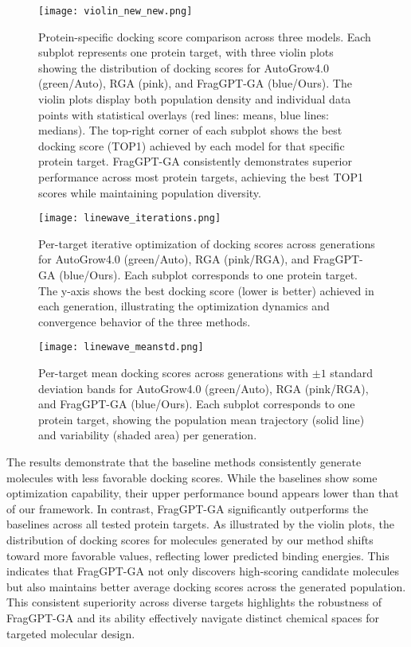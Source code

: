 \documentclass[lettersize,journal]{IEEEtran}
\begin{document}
\begin{figure*}[!t]
\centering
\texttt{[image: violin\_new\_new.png]}
\caption{Protein-specific docking score comparison across three models. Each subplot represents one protein target, with three violin plots showing the distribution of docking scores for AutoGrow4.0 (green/Auto), RGA (pink), and FragGPT-GA (blue/Ours). The violin plots display both population density and individual data points with statistical overlays (red lines: means, blue lines: medians). The top-right corner of each subplot shows the best docking score (TOP1) achieved by each model for that specific protein target. FragGPT-GA consistently demonstrates superior performance across most protein targets, achieving the best TOP1 scores while maintaining population diversity.}
\label{fig:violin_comparison}
\end{figure*}

\begin{figure*}[!t]
\centering
\texttt{[image: linewave\_iterations.png]}
\caption{Per-target iterative optimization of docking scores across generations for AutoGrow4.0 (green/Auto), RGA (pink/RGA), and FragGPT-GA (blue/Ours). Each subplot corresponds to one protein target. The y-axis shows the best docking score (lower is better) achieved in each generation, illustrating the optimization dynamics and convergence behavior of the three methods.}
\label{fig:linewave_iterations}
\end{figure*}

\begin{figure*}[!t]
\centering
\texttt{[image: linewave\_meanstd.png]}
\caption{Per-target mean docking scores across generations with $\pm 1$ standard deviation bands for AutoGrow4.0 (green/Auto), RGA (pink/RGA), and FragGPT-GA (blue/Ours). Each subplot corresponds to one protein target, showing the population mean trajectory (solid line) and variability (shaded area) per generation.}
\label{fig:linewave_meanstd}
\end{figure*}

The results demonstrate that the baseline methods consistently generate molecules with less favorable docking scores. While the baselines show some optimization capability, their upper performance bound appears lower than that of our framework. In contrast, FragGPT-GA significantly outperforms the baselines across all tested protein targets. As illustrated by the violin plots, the distribution of docking scores for molecules generated by our method shifts toward more favorable values, reflecting lower predicted binding energies. This indicates that FragGPT-GA not only discovers high-scoring candidate molecules but also maintains better average docking scores across the generated population. This consistent superiority across diverse targets highlights the robustness of FragGPT-GA and its ability effectively navigate distinct chemical spaces for targeted molecular design.
\end{document}
